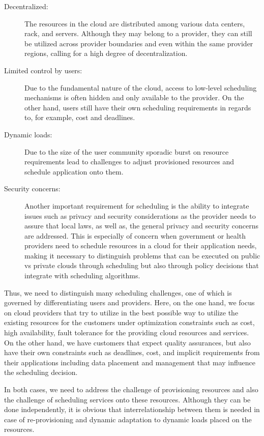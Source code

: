 \documentclass[final,5p,times,twocolumn]{elsarticle}
\begin{document}
\begin{description}
\item [Decentralized:] The resources in the cloud are distributed among various data centers, rack, and servers. Although they may belong to a provider, they can still be utilized across provider boundaries and even within the same provider regions, calling for a high degree of decentralization.

\item[Limited control by users:] Due to the fundamental nature of the cloud, access to low-level scheduling mechanisms is often hidden and only available to the provider. On the other hand, users still have their own scheduling requirements in regards to, for example, cost and deadlines.
 
\item[Dynamic loads:] Due to the size of the user community sporadic burst on resource requirements lead to challenges to adjust provisioned resources and schedule application onto them.

\item[Security concerns:] Another important requirement for scheduling is the ability to integrate issues such as privacy and security considerations as the provider needs to assure that local laws, as well as, the general privacy and security concerns are addressed. This is especially of concern when government or health providers need to schedule resources in a cloud for their application needs, making it necessary to distinguish problems that can be executed on public vs private clouds through scheduling but also through policy decisions that integrate with scheduling algorithms.
 
\end{description}

Thus, we need to distinguish many scheduling challenges, one of which is governed by differentiating users and providers. Here, on the one hand, we focus on cloud providers that try to utilize in the best possible way to utilize the existing resources for the customers under optimization constraints such as cost, high availability, fault tolerance for the providing cloud resources and services. On the other hand, we have customers that expect quality assurances, but also have their own constraints such as deadlines, cost, and implicit requirements from their applications including data placement and management that may influence the scheduling decision.

In both cases, we need to address the challenge of provisioning resources and also the challenge of scheduling services onto these resources. Although they can be done independently, it is obvious that interrelationship between them is needed in case of re-provisioning and dynamic adaptation to dynamic loads placed on the resources.
\end{document}
